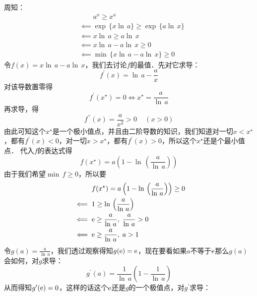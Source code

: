 \solve 周知：
\begin{align}
    &\mathrel{\phantom{\impliedby}} a^x \geq x^a \\
    &\impliedby \exp \, \{ x \ln \, a \} \geq \exp \, \{ a \ln \, x \} \\
    &\impliedby x \ln \, a \geq a \ln \, x \\
    &\impliedby x \ln \, a - a \ln \, x \geq 0 \\
    &\impliedby \min \, \{ x \ln \, a - a \ln \, x \} \geq 0
\end{align}
令$f(x) = x \ln \, a - a \ln \, x$，我们去讨论$f$的最值．先对它求导：
\begin{equation}
    f^{\prime} (x) = \ln \, a - \frac{a}{x}
\end{equation}
对该导数置零得
\begin{equation}
    f^{\prime} (x^\star) = 0 \iff x^\star = \frac{a}{\ln \, a}
\end{equation}
再求导，得
\begin{equation}
    f^{\prime\prime} (x) = \frac{a}{x^2} > 0 \, \quad (x > 0)
\end{equation}
由此可知这个$x^\star$是一个极小值点，并且由二阶导数的知识，我们知道对一切$x < x^\star$，都有$f^{\prime}(x) < 0$，对一切$x > x^\star$，都有$f^{\prime}(x)>0$，所以这个$x^\star$还是个最小值点．
代入$f$的表达式得
\begin{equation}
    f(x^\star) = a \left(1 - \ln \, \left(\displaystyle\frac{a}{\ln \, a}\right)\right)
\end{equation}
由于我们希望$\min \, f \geq 0$，所以要
\begin{align}
    &\mathrel{\phantom{\impliedby}} f(x^\star) = a \left(1 - \ln \, \left(\displaystyle\frac{a}{\ln \, a}\right)\right) \geq 0 \\
    &\impliedby 1 \geq \ln \, \left(\displaystyle\frac{a}{\ln \, a}\right) \\
    &\impliedby \mathrm{e} \geq \displaystyle\frac{a}{\ln \, a}, \; \frac{a}{\ln \, a} > 0 \\
    &\impliedby \mathrm{e} \geq \displaystyle\frac{a}{\ln \, a}, \; a > 1
\end{align}
令$g(a) = \displaystyle\frac{a}{\ln \, a}$，我们透过观察得知$g(\mathrm{e}) = \mathrm{e}$，现在要看如果$a$不等于$\mathrm{e}$那么$g(a)$会如何，对$g$求导：
\begin{equation}
    g^{\prime}(a) = \frac{1}{\ln \, a}\left(1- \frac{1}{\ln \, a}\right)
\end{equation}
从而得知$g^{\prime}(\mathrm{e}) = 0$，这样的话这个$\mathrm{e}$还是$g$的一个极值点，对$g^{\prime}$求导：
